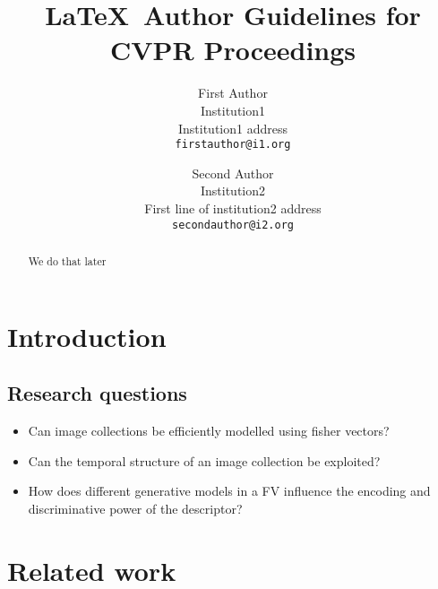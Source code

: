 \documentclass[10pt,twocolumn,letterpaper]{article}
\begin{document}
\title{\LaTeX\ Author Guidelines for CVPR Proceedings}

\author{First Author\\
Institution1\\
Institution1 address\\
{\tt\small firstauthor@i1.org}
\and
Second Author\\
Institution2\\
First line of institution2 address\\
{\tt\small secondauthor@i2.org}
}

\maketitle

\begin{abstract}
We do that later
\end{abstract}

\section{Introduction}


\subsection{Research questions}

\begin{itemize}
\item Can image collections be efficiently modelled using fisher vectors?
\item Can the temporal structure of an image collection be exploited?
\item How does different generative models in a FV influence the encoding and discriminative power of the descriptor?
\end{itemize}

\section{Related work}
\end{document}

